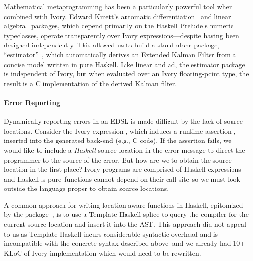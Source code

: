Mathematical metaprogramming has been a particularly powerful tool when combined
with Ivory. Edward Kmett's automatic differentiation~\cite{ad} and linear
algebra~\cite{linear} packages, which depend primarily on the Haskell Prelude's
numeric typeclasses, operate transparently over Ivory expressions---despite
having been designed independently. This allowed us to build a stand-alone
package, ``estimator''~\cite{estimator}, which automatically derives an Extended
Kalman Filter from a concise model written in pure Haskell. Like linear and ad,
the estimator package is independent of Ivory, but when evaluated over an Ivory
floating-point type, the result is a C implementation of the derived Kalman
filter.


\paragraph{Error Reporting}


Dynamically reporting errors in an EDSL is made difficult by the lack of
source locations. Consider the Ivory expression \hbox{,} which induces a
runtime assertion , inserted into the generated back-end (e.g., C code). If the assertion fails, we would like to include
a \emph{Haskell} source location in the error message to direct the programmer to the source of
the error. But how are we to obtain the source location in the first place?
Ivory programs are comprised of Haskell expressions and Haskell is
pure--functions cannot depend on their call-site--so we must look outside the
language proper to obtain source locations.

A common approach for writing location-aware functions in Haskell, epitomized by
the  package~\cite{file-location}, is to use a Template
Haskell splice to query the compiler for the current source location and insert
it into the AST. This approach did not appeal to us as Template Haskell incurs
considerable syntactic overhead and is incompatible with the concrete syntax
described above, and we already had 10+ KLoC of Ivory implementation which would need to be
rewritten.

